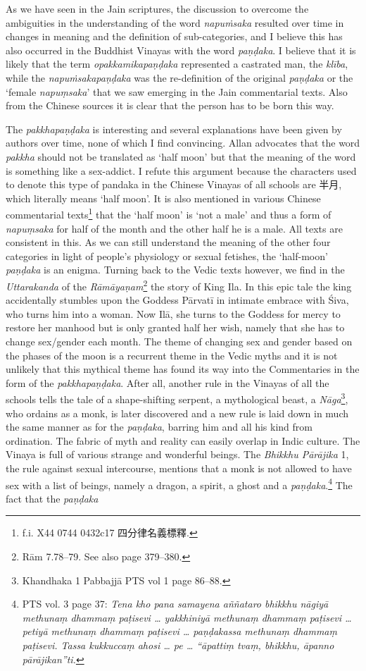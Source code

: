 As we have seen in the Jain scriptures, the discussion to overcome the ambiguities in the understanding of the word {\em napuṁsaka} resulted over time in changes in meaning and the definition of sub-categories, and I believe this has also occurred in the Buddhist Vinayas with the word {\em paṇḍaka}. I believe that it is likely that the term {\em opakkamikapaṇḍaka} represented a castrated man, the {\em klība}, while the {\em napuṁsakapaṇḍaka} was the re-definition of the original {\em paṇḍaka} or the `female {\em napuṃsaka}' that we saw emerging in the Jain commentarial texts. Also from the Chinese sources it is clear that the person has to be born this way.

The {\em pakkhapaṇḍaka} is interesting and several explanations have been given by authors over time, none of which I find convincing. Allan \cite{bomhard} advocates that the word {\em pakkha} should not be translated as `half moon' but that the meaning of the word is something like a sex-addict. I refute this argument because the characters used to denote this type of pandaka in the Chinese Vinayas of all schools are 半月, which literally means `half moon'. It is also mentioned in various Chinese commentarial texts\footnote{f.i. X44 0744 0432c17 四分律名義標釋.} that the `half moon' is `not a male' and thus a form of {\em napuṃsaka} for half of the month and the other half he is a male. All texts are consistent in this. As we can still understand the meaning of the other four categories in light of people's physiology or sexual fetishes, the `half-moon' {\em paṇḍaka} is an enigma. Turning back to the Vedic texts however, we find in the {\em Uttarakanda} of the {\em Rāmāyaṇam}\footnote{Rām 7.78–79. See also \cite{goldman} page 379–380.} the story of King Ila. In this epic tale the king accidentally stumbles upon the Goddess Pārvatī in intimate embrace with Śiva, who turns him into a woman. Now Ilā, she turns to the Goddess for mercy to restore her manhood but is only granted half her wish, namely that she has to change sex/gender each month. The theme of changing sex and gender based on the phases of the moon is a recurrent theme in the Vedic myths and it is not unlikely that this mythical theme has found its way into the Commentaries in the form of the {\em pakkhapaṇḍaka}. After all, another rule in the Vinayas of all the schools tells the tale of a shape-shifting serpent, a mythological beast, a {\em Nāga}\footnote{Khandhaka 1 Pabbajjā PTS vol 1 page 86–88.}, who ordains as a monk, is later discovered and a new rule is laid down in much the same manner as for the {\em paṇḍaka}, barring him and all his kind from ordination. The fabric of myth and reality can easily overlap in Indic culture. The Vinaya is full of various strange and wonderful beings. The ­{\em Bhikkhu Pā­rāji­ka} 1, the rule against sexual intercourse, mentions that a monk is not allowed to have sex with a list of beings, namely a dragon, a spirit, a ghost and a {\em paṇḍaka}.\footnote{PTS vol. 3 page 37: {\em Tena kho pana samayena aññataro bhikkhu nāgiyā methunaṃ dhammaṃ paṭisevi … yakkhiniyā methunaṃ dhammaṃ paṭisevi … petiyā methunaṃ dhammaṃ paṭisevi … paṇḍakassa methunaṃ dhammaṃ paṭisevi. Tassa kukkuccaṃ ahosi … pe … “āpattiṃ tvaṃ, bhikkhu, āpanno pārājikan”ti.}} The fact that the {\em paṇḍaka} 